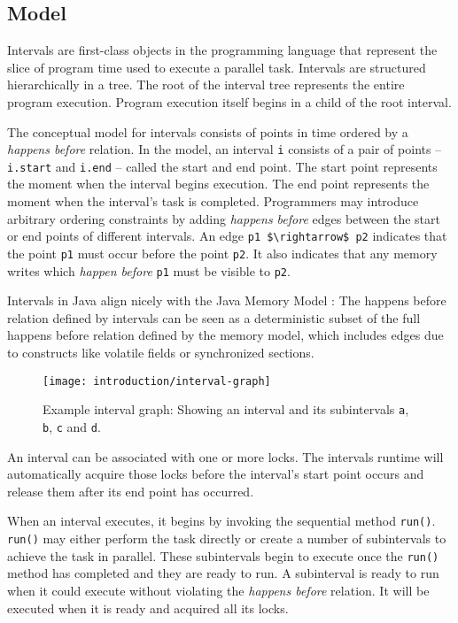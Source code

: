 \subsection{Model}
\label{sec:intro-intervals-model}

Intervals are first-class objects in the programming language that
represent the slice of program time used to execute a parallel
task. Intervals are structured hierarchically in a tree. The root of
the interval tree represents the entire program execution. Program
execution itself begins in a child of the root interval.

The conceptual model for intervals consists of points in time ordered
by a \emph{happens before} relation. In the model, an interval
\lstinline|i| consists of a pair of points -- \lstinline|i.start| and
\lstinline|i.end| -- called the start and end point. The start point
represents the moment when the interval begins execution. The end
point represents the moment when the interval's task is
completed. Programmers may introduce arbitrary ordering constraints by
adding \emph{happens before} edges between the start or end points of
different intervals. An edge \lstinline|p1 $\rightarrow$ p2| indicates
that the point \lstinline|p1| must occur before the point
\lstinline|p2|. It also indicates that any memory writes which
\emph{happen before} \lstinline|p1| must be visible to \lstinline|p2|.

Intervals in Java align nicely with the Java Memory Model
\cite{Manson2005}: The happens before relation defined by intervals
can be seen as a deterministic subset of the full happens before
relation defined by the memory model, which includes edges due to
constructs like volatile fields or synchronized sections.

\begin{figure}[htb]
  \centering
  \texttt{[image: introduction/interval-graph]}
  \caption[Example interval graph]{Example interval graph: Showing an
    interval and its subintervals \lstinline|a|, \lstinline|b|,
    \lstinline|c| and \lstinline|d|.}
  \label{fig:interval-graph}
\end{figure}

An interval can be associated with one or more locks. The intervals
runtime will automatically acquire those locks before the interval's
start point occurs and release them after its end point has occurred.

When an interval executes, it begins by invoking the sequential method
\lstinline|run()|. \lstinline|run()| may either perform the task
directly or create a number of subintervals to achieve the task in
parallel. These subintervals begin to execute once the
\lstinline|run()| method has completed and they are ready to run. A
subinterval is ready to run when it could execute without violating
the \emph{happens before} relation. It will be executed when it is
ready and acquired all its locks.

